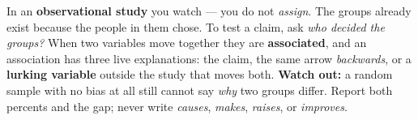 \documentclass[12pt]{article}
\begin{document}
\vspace{0.14in}

\begin{remindbox}
\small
In an \textbf{observational study} you watch --- you do not \emph{assign}. The groups already
exist because the people in them chose. To test a claim, ask \emph{who decided the groups?}
When two variables move together they are \textbf{associated}, and an association has three
live explanations: the claim, the same arrow \emph{backwards}, or a \textbf{lurking variable}
outside the study that moves both. \textbf{Watch out:} a random sample with no bias at all
still cannot say \emph{why} two groups differ. Report both percents and the gap; never write
\emph{causes}, \emph{makes}, \emph{raises}, or \emph{improves}.
\end{remindbox}
\end{document}
